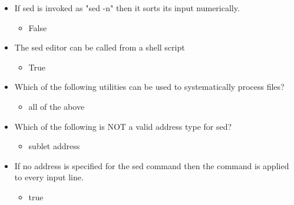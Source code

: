 \documentclass{report}
\begin{document}
\begin{itemize}
        \item If sed is invoked as "sed -n" then it sorts its input numerically.
            \begin{itemize}
                \item False
            \end{itemize}
        \item The sed editor can be called from a shell script
            \begin{itemize}
                \item True
            \end{itemize}
        \item Which of the following utilities can be used to systematically process files?
            \begin{itemize}
                \item all of the above
            \end{itemize}
        \item Which of the following is NOT a valid address type for sed?
            \begin{itemize}
                \item sublet address
            \end{itemize}
        \item If no address is specified for the sed command then the command is applied to every input line.
            \begin{itemize}
                \item true
            \end{itemize}
    \end{itemize}
\end{document}
